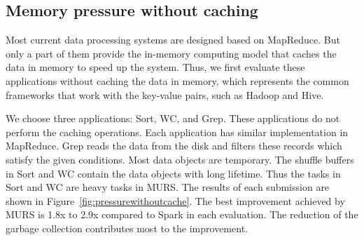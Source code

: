 \subsection{Memory pressure without caching}

Most current data processing systems are designed based on MapReduce. But only a part of them provide the in-memory computing model that caches the data in memory to speed up the system. Thus, we first evaluate these applications without caching the data in memory, which represents the common frameworks that work with the key-value pairs, such as Hadoop and Hive.

We choose three applications: Sort, WC, and Grep. These applications do not perform the caching operations. Each application has similar implementation in MapReduce. Grep reads the data from the disk and filters these records which satisfy the given conditions. Most data objects are temporary. The shuffle buffers in Sort and WC contain the data objects with long lifetime. Thus the tasks in Sort and WC are heavy tasks in MURS. The results of each submission are shown in Figure~\ref{fig:pressurewithoutcache}. The best improvement achieved by MURS is 1.8x to 2.9x compared to Spark in each evaluation. The reduction of the garbage collection contributes most to the improvement.

\begin{figure*}[!t]
\centering
{}
\caption{Results of memory pressure without caching}
\label{fig:pressurewithoutcache}
\end{figure*}

